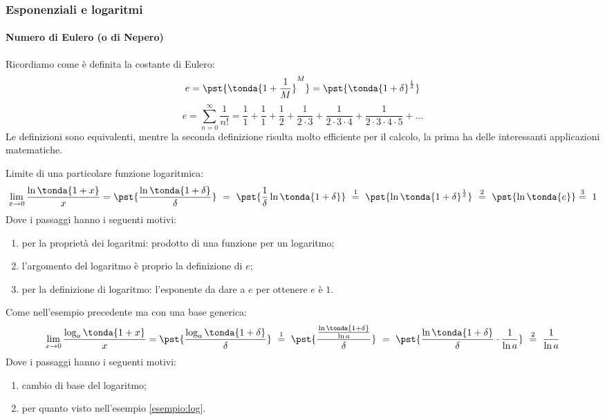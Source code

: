 \subsubsection{Esponenziali e logaritmi}

\paragraph{Numero di Eulero (o di Nepero)}

Ricordiamo come è definita la costante di Eulero:
\[e = \pst{\tonda{1+\frac{1}{M}}^M} = 
\pst{\tonda{1+\delta}^\frac{1}{\delta}} 
\]
\[e=\sum_{n=0}^{\infty}{\frac{1}{n!}}=
\frac{1}{1}+\frac{1}{1}+\frac{1}{2}+\frac{1}{2\cdot3}+
\frac{1}{2\cdot3\cdot4}+\frac{1}{2\cdot3\cdot4\cdot5}+\dots\]
Le definizioni sono equivalenti, mentre la seconda definizione risulta 
molto efficiente per il calcolo, la 
prima ha delle interessanti applicazioni matematiche.

\begin{esempio}
\label{esempio:log}
Limite di una particolare funzione logaritmica:
\[
 \lim_{x \rightarrow 0} \dfrac{\ln\tonda{1+x}}{x} =
 \pst{\dfrac{\ln\tonda{1+\delta}}{\delta}}~ = ~  
 \pst{\frac{1}{\delta}\ln\tonda{1+\delta}} ~\stackrel{1}{=} ~
 \pst{\ln\tonda{1+\delta}^\frac{1}{\delta}}
~ \stackrel{2}{=} ~
\pst{\ln\tonda{e}} \stackrel{3}{=} ~ 1
\]
Dove i passaggi hanno i seguenti motivi:
\begin{enumerate} [nosep]
 \item per la proprietà dei logaritmi: prodotto di una funzione per 
 un logaritmo;
 \item l'argomento del logaritmo è proprio la definizione di \(e\);
 \item per la definizione di logaritmo: l'esponente da dare a \(e\) per 
ottenere \(e\) è \(1\).
\end{enumerate}
\end{esempio}

\begin{esempio}
Come nell'esempio precedente ma con una base generica:
\[
 \lim_{x \rightarrow 0} \dfrac{\log_a\tonda{1+x}}{x} =
 \pst{\dfrac{\log_a\tonda{1+\delta}}{\delta}}~\stackrel{1}{=} ~  
 \pst{\dfrac{\frac{\ln\tonda{1+\delta}}{\ln a}}{\delta}}~= ~
 \pst{\dfrac{\ln\tonda{1+\delta}}{\delta}\cdot \dfrac{1}{\ln a}}
 ~ \stackrel{2}{=} ~
 \dfrac{1}{\ln a}
\]
Dove i passaggi hanno i seguenti motivi:
\begin{enumerate} [nosep]
 \item cambio di base del logaritmo;
 \item per quanto visto nell'esempio \ref{esempio:log}.
\end{enumerate}
\end{esempio}

